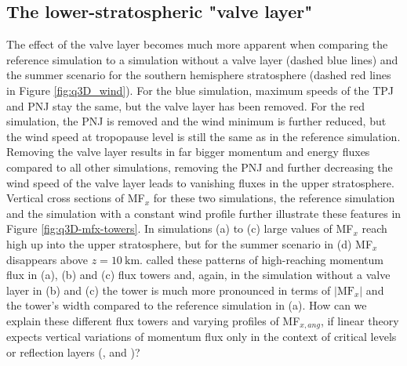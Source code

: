 \subsection*{The lower-stratospheric "valve layer"}
The effect of the valve layer becomes much more apparent when comparing the reference simulation to a simulation without a valve layer (dashed blue lines) and the summer scenario for the southern hemisphere stratosphere (dashed red lines in Figure \ref{fig:q3D_wind}). For the blue simulation, maximum speeds of the TPJ and PNJ stay the same, but the valve layer has been removed. For the red simulation, the PNJ is removed and the wind minimum is further reduced, but the wind speed at tropopause level is still the same as in the reference simulation. Removing the valve layer results in far bigger momentum and energy fluxes compared to all other simulations, removing the PNJ and further decreasing the wind speed of the valve layer leads to vanishing fluxes in the upper stratosphere.\\
Vertical cross sections of MF$_x$ for these two simulations, the reference simulation and the simulation with a constant wind profile further illustrate these features in Figure \ref{fig:q3D-mfx-towers}. In simulations (a) to (c) large values of MF$_x$ reach high up into the upper stratosphere, but for the summer scenario in (d) MF$_x$ disappears above $z=\SI{10}{\kilo\meter}$. \textcite[]{kruse_gravity_2015} called these patterns of high-reaching momentum flux in (a), (b) and (c) flux towers and, again, in the simulation without a valve layer in (b) and (c) the tower is much more pronounced in terms of $\lvert \mathrm{MF}_x \rvert$ and the tower's width compared to the reference simulation in (a). How can we explain these different flux towers and varying profiles of MF$_{x,ang}$, if linear theory expects vertical variations of momentum flux only in the context of critical levels or reflection layers (\cite[]{booker_critical_1967}, \cite[]{jones_propagation_1967} and \cite[]{broad_linear_1995})?

